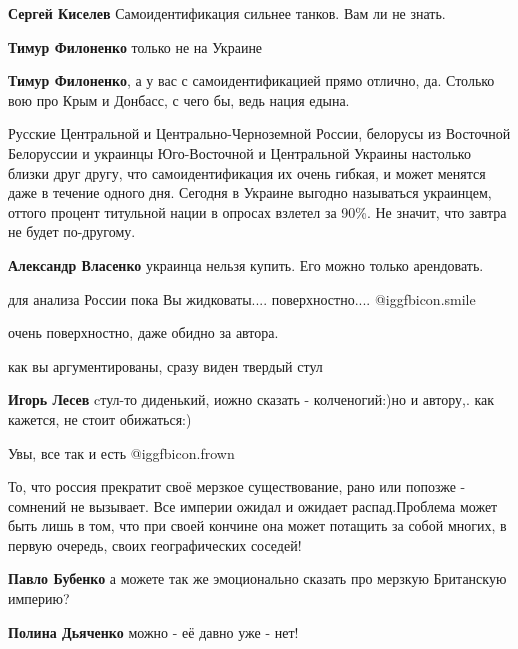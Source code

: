 \begin{itemize}
\begin{itemize}
\textbf{Сергей Киселев} Самоидентификация сильнее танков. Вам ли не знать.

\textbf{Тимур Филоненко} только не на Украине

\textbf{Тимур Филоненко}, а у вас с самоидентификацией прямо отлично, да. Столько вою про Крым и Донбасс, с чего бы, ведь нация едына.


Русские Центральной и Центрально-Черноземной России, белорусы из Восточной
Белоруссии и украинцы Юго-Восточной и Центральной Украины настолько близки друг
другу, что самоидентификация их очень гибкая, и может менятся даже в течение
одного дня. Сегодня в Украине выгодно называться украинцем, оттого процент
титульной нации в опросах взлетел за 90\%. Не значит, что завтра не будет
по-другому.


\textbf{Александр Власенко} украинца нельзя купить. Его можно только арендовать.

\end{itemize} %


для анализа России пока Вы жидковаты.... поверхностно.... @igg{fbicon.smile} 

\begin{itemize} %
очень поверхностно, даже обидно за автора.

как вы аргументированы, сразу виден твердый стул

\textbf{Игорь Лесев} cтул-то диденький, иожно сказать - колченогий:)но и автору,. как кажется, не стоит обижаться:)
\end{itemize} %

Увы, все так и есть  @igg{fbicon.frown} 


То, что россия прекратит своё мерзкое существование, рано или попозже -
сомнений не вызывает. Все империи ожидал и ожидает распад.Проблема может быть
лишь в том, что при своей кончине она может потащить за собой многих, в первую
очередь, своих географических соседей!

\begin{itemize} %
\textbf{Павло Бубенко} а можете так же эмоционально сказать про мерзкую Британскую империю?

\textbf{Полина Дьяченко} можно - её давно уже - нет!


\end{itemize}
\end{itemize}
